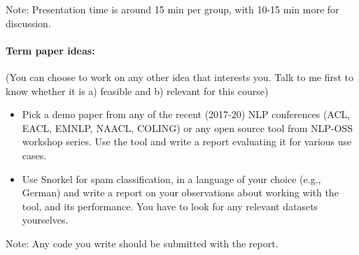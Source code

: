 \documentclass[11pt,a4paper]{article}
\begin{document}
Note: Presentation time is around 15 min per group, with 10-15 min more for discussion.

\paragraph{Term paper ideas: }
(You can choose to work on any other idea that interests you. Talk to me first to know whether it is a) feasible and b) relevant for this course)
\begin{itemize}
\item Pick a demo paper from any of the recent (2017-20) NLP conferences (ACL, EACL, EMNLP, NAACL, COLING) or any open source tool from NLP-OSS workshop series. Use the tool and write a report evaluating it for various use cases. 
\item Use Snorkel for spam classification, in a language of your choice (e.g., German) and write a report on your observations about working with the tool, and its performance. You have to look for any relevant datasets yourselves.
\end{itemize}
Note: Any code you write should be submitted with the report. 
\end{document}
